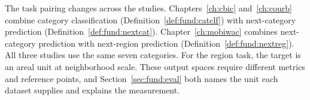 The task pairing changes across the studies. Chapters~\ref{ch:cbic}
and~\ref{ch:courb} combine category classification
(Definition~\ref{def:fund:catclf}) with next-category prediction
(Definition~\ref{def:fund:nextcat}). Chapter~\ref{ch:mobiwac} combines next-category
prediction with next-region prediction (Definition~\ref{def:fund:nextreg}). All three
studies use the same seven categories. For the region task, the target is an areal unit at
neighborhood scale. These output spaces require different metrics and reference points,
and Section~\ref{sec:fund:eval} both names the unit each dataset supplies and explains
the measurement.

